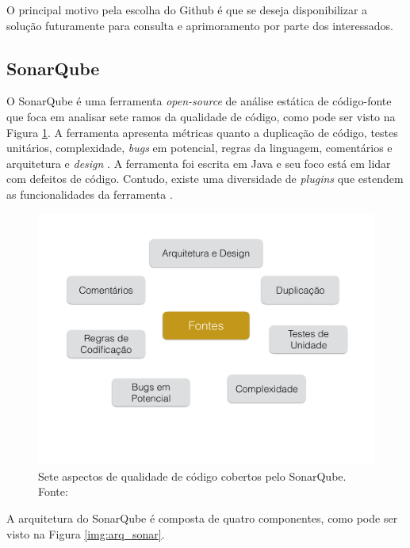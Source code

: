 O principal motivo pela escolha do Github é que se deseja disponibilizar a solução futuramente para consulta e aprimoramento por parte dos interessados. 		

	\subsection{SonarQube}
	\label{sub:sonarqube}
	O SonarQube é uma ferramenta \textit{open-source} de análise estática de código-fonte que foca em analisar sete ramos da qualidade de código, como pode ser visto na Figura \ref{img:sonar}. A ferramenta apresenta métricas quanto a duplicação de código, testes unitários, complexidade, \textit{bugs} em potencial, regras da linguagem, comentários e arquitetura e \textit{design} \cite{sonar}. A ferramenta foi escrita em Java e seu foco está em lidar com defeitos de código. Contudo, existe uma diversidade de \textit{plugins} que estendem as funcionalidades da ferramenta \cite{ferenc_source_2014}.
\graphicspath{{figuras/}}
\begin{figure}[h]
\centering
\includegraphics[scale=0.3]{Sonar}
\caption{Sete  aspectos de qualidade de código cobertos pelo SonarQube. Fonte: \cite{sonar}}
\label{img:sonar}
\end{figure}
A arquitetura do SonarQube é composta de quatro componentes, como pode ser visto na Figura \ref{img:arq_sonar}\cite{sonar}.
